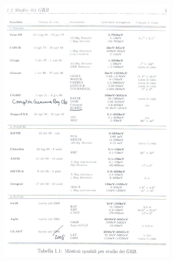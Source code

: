 \begin{figure}[h!]
	\centering
	\includegraphics[width=0.8\textwidth]{Img/bertin_13.jpg}
\end{figure}

